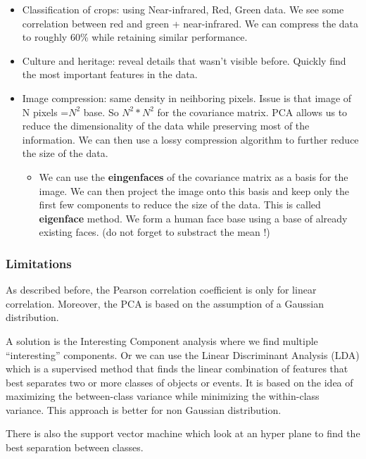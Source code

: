 \documentclass[
  a4paper,
  ,captions=tableheading
]{scrartcl}
\providecommand{\tightlist}{%
  \setlength{\itemsep}{0pt}\setlength{\parskip}{0pt}}
\begin{document}
\begin{itemize}
\tightlist
\item
  Classification of crops: using Near-infrared, Red, Green data. We see
  some correlation between red and green + near-infrared. We can
  compress the data to roughly 60\% while retaining similar performance.
\item
  Culture and heritage: reveal details that wasn't visible before.
  Quickly find the most important features in the data.
\item
  Image compression: same density in neihboring pixels. Issue is that
  image of N pixels =\(N^2\) base. So \(N^2*N^2\) for the covariance
  matrix. PCA allows us to reduce the dimensionality of the data while
  preserving most of the information. We can then use a lossy
  compression algorithm to further reduce the size of the data.

  \begin{itemize}
  \tightlist
  \item
    We can use the \textbf{eingenfaces} of the covariance matrix as a
    basis for the image. We can then project the image onto this basis
    and keep only the first few components to reduce the size of the
    data. This is called \textbf{eigenface} method. We form a human face
    base using a base of already existing faces. (do not forget to
    substract the mean !)
  \end{itemize}
\end{itemize}

\subsubsection{Limitations}\label{limitations}

As described before, the Pearson correlation coefficient is only for
linear correlation. Moreover, the PCA is based on the assumption of a
Gaussian distribution.

A solution is the Interesting Component analysis where we find multiple
``interesting'' components. Or we can use the Linear Discriminant
Analysis (LDA) which is a supervised method that finds the linear
combination of features that best separates two or more classes of
objects or events. It is based on the idea of maximizing the
between-class variance while minimizing the within-class variance. This
approach is better for non Gaussian distribution.

There is also the support vector machine which look at an hyper plane to
find the best separation between classes.
\end{document}
